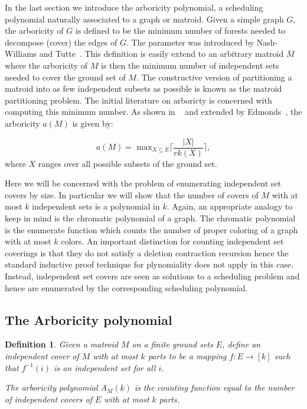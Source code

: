 \documentclass[12pt,reqno]{amsart}
\newtheorem{definition}{Definition}
\numberwithin{definition}{section}
\theoremstyle{definition}
\begin{document}
In the last section we introduce the arboricity polynomial, a
scheduling polynomial naturally associated to a graph or matroid.
Given a simple graph $G$, the arboricity of $G$ is defined to be the
minimum number of forests needed to decompose (cover) the edges of
$G$.  The parameter was introduced by Nash-Williams and Tutte~\cite{Nash, Tutte}.
This definition is easily extend to an arbitrary matroid $M$ where the
arboricity of $M$ is then the minimum number of independent sets needed to
cover the ground set of $M$.  The constructive version of partitioning
a matroid into as few independent subsets as possible is known as the
matroid partitioning problem. The initial
literature on arboricty is concerned with computing this minimum number.  As shown in 
~\cite{Nash, Tutte} and extended by Edmonds~\cite{Edmonds}, the arboricity $a(M)$ is given
by:

$$ a(M) = \textrm{ max}_{X\subseteq E} \lceil { \frac{|X|}{rk(X)}} \rceil, $$
where $X$ ranges over all possible subsets of the ground set.

Here we will be concerned with the problem of enumerating independent
set covers by size.  In particular we will show that the number of
covers of $M$ with at most $k$ independent sets is a polynomial in
$k$.  Again, an appropriate analogy to keep in mind is the chromatic
polynomial of a graph.  The chromatic polynomial is the enumerate
function which counts the number of proper coloring of a graph with at
most $k$ colors.  
 An important distinction for counting independent set coverings is
 that they do not satisfy a deletion contraction recursion hence the
 standard inductive proof technique for plynomiality does not apply in
 this case.  Instead, independent set covers are seen as solutions to
 a scheduling problem and hence are enumerated by the corresponding
 scheduling polynomial.


\subsection{The Arboricity polynomial}

\begin{definition} Given a matroid $M$ on a finite ground sets $E$, define an independent cover of $M$ with at most $k$ parts to be a mapping $f : E \rightarrow [k]$ such that $f^{-1}(i)$ is an independent set for all $i$.  

  The arboricity polynomial $A_M(k)$ is the counting function equal to the number of independent covers of $E$ with at most $k$ parts.
\end{definition}
\end{document}
